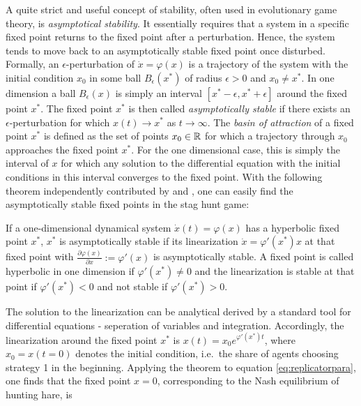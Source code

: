 A quite strict and useful concept of stability, often used in evolutionary 
game theory, is \textit{asymptotical stability}. 
It essentially requires that a system in a specific fixed point returns 
to the fixed point after a perturbation.
Hence, the system tends to move back to an asymptotically stable fixed point
once disturbed. Formally, an $\epsilon$-perturbation of 
$\dot{x} = \varphi(x)$ is a trajectory of the system with the initial
condition $x_0$ in some ball $B_\epsilon(x^*)$ of radius $\epsilon >0$ and 
$x_0 \neq x^*$. 
In one dimension a ball $B_{\epsilon}(x)$ is simply an interval 
$[x^*-\epsilon, x^*+\epsilon]$ around the fixed point $x^*$.
The fixed point $x^*$ is then called \textit{asymptotically
stable} if there exists an $\epsilon$-perturbation for which $x(t) \rightarrow
x^*$ as $t \rightarrow \infty$. 
The \textit{basin of attraction} of a fixed point $x^*$ is defined as the set 
of points $x_0 \in \mathbb{R}$ for which a trajectory through $x_0$ approaches 
the fixed point $x^*$. For the one dimensional case, 
this is simply the interval 
of $x$ for which any solution to the differential equation with the initial 
conditions in this interval converges to the fixed point. With the following 
theorem independently contributed by \textcite{hartman_lemma_1960} and 
\textcite{grobman_homeomorphism_1959}, one can easily 
find the asymptotically stable fixed points in the stag hunt game:
\begin{mydef}
        If a one-dimensional dynamical system $\dot{x}(t) = \varphi(x)$ 
        has a hyperbolic fixed point $x^*$, $x^*$ is asymptotically stable
        if its linearization 
        $\dot{x} = \varphi'(x^*)x$ at that fixed point with 
        $\frac{\partial \varphi(x)}{\partial x}:= \varphi'(x)$
        is asymptotically stable. 
        A fixed point is called hyperbolic in one dimension if 
        $\varphi'(x^*) \neq 0$ and the linearization is stable at that
        point if $\varphi'(x^*) < 0$ and not stable if $\varphi'(x^*) >0$.
\end{mydef}
The solution to the linearization can be analytical derived by 
a standard tool for differential equations - seperation of variables and 
integration.
Accordingly, the linearization around the fixed point $x^*$ is 
$x(t)= x_0 e^{\varphi'(x^*)t}$, where $x_0=x(t=0)$ denotes the 
initial condition, i.e.\ the share of agents choosing strategy 1 in the 
beginning.
Applying the theorem to equation \eqref{eq:replicatorpara}, 
one finds that the 
fixed point $x=0$, corresponding to the Nash equilibrium of hunting hare, is 
